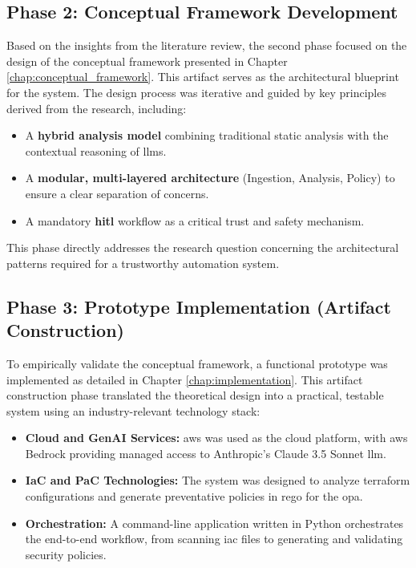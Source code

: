 \subsection{Phase 2: Conceptual Framework Development}
Based on the insights from the literature review, the second phase focused on the design of the conceptual framework presented in Chapter \ref{chap:conceptual_framework}. This artifact serves as the architectural blueprint for the system. The design process was iterative and guided by key principles derived from the research, including:
\begin{itemize}
    \item A \textbf{hybrid analysis model} combining traditional static analysis with the contextual reasoning of \glspl{llm}.
    \item A \textbf{modular, multi-layered architecture} (Ingestion, Analysis, Policy) to ensure a clear separation of concerns.
    \item A mandatory \textbf{\gls{hitl}} workflow as a critical trust and safety mechanism.
\end{itemize}
This phase directly addresses the research question concerning the architectural patterns required for a trustworthy automation system.

\subsection{Phase 3: Prototype Implementation (Artifact Construction)}
To empirically validate the conceptual framework, a functional prototype was implemented as detailed in Chapter \ref{chap:implementation}. This artifact construction phase translated the theoretical design into a practical, testable system using an industry-relevant technology stack:
\begin{itemize}
    \item \textbf{Cloud and GenAI Services:} \gls{aws} was used as the cloud platform, with \gls{aws} Bedrock providing managed access to Anthropic's Claude 3.5 Sonnet \gls{llm}.
    \item \textbf{IaC and PaC Technologies:} The system was designed to analyze \gls{terraform} configurations and generate preventative policies in \gls{rego} for the \gls{opa}.
    \item \textbf{Orchestration:} A command-line application written in Python orchestrates the end-to-end workflow, from scanning \gls{iac} files to generating and validating security policies.
\end{itemize}

